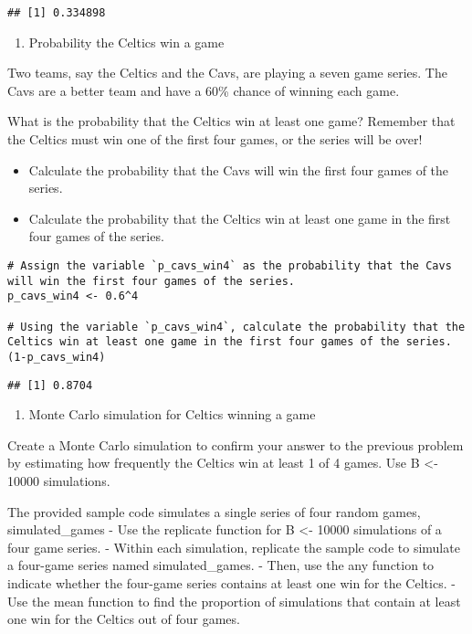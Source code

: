 \documentclass[
]{article}
\providecommand{\tightlist}{%
  \setlength{\itemsep}{0pt}\setlength{\parskip}{0pt}}
\begin{document}
\begin{verbatim}
## [1] 0.334898
\end{verbatim}

\begin{enumerate}
\def\labelenumi{\arabic{enumi}.}
\setcounter{enumi}{3}
\tightlist
\item
  Probability the Celtics win a game
\end{enumerate}

Two teams, say the Celtics and the Cavs, are playing a seven game
series. The Cavs are a better team and have a 60\% chance of winning
each game.

What is the probability that the Celtics win at least one game? Remember
that the Celtics must win one of the first four games, or the series
will be over!

\begin{itemize}
\tightlist
\item
  Calculate the probability that the Cavs will win the first four games
  of the series.
\item
  Calculate the probability that the Celtics win at least one game in
  the first four games of the series.
\end{itemize}

\begin{verbatim}
# Assign the variable `p_cavs_win4` as the probability that the Cavs will win the first four games of the series.
p_cavs_win4 <- 0.6^4

# Using the variable `p_cavs_win4`, calculate the probability that the Celtics win at least one game in the first four games of the series.
(1-p_cavs_win4)
\end{verbatim}

\begin{verbatim}
## [1] 0.8704
\end{verbatim}

\begin{enumerate}
\def\labelenumi{\arabic{enumi}.}
\setcounter{enumi}{4}
\tightlist
\item
  Monte Carlo simulation for Celtics winning a game
\end{enumerate}

Create a Monte Carlo simulation to confirm your answer to the previous
problem by estimating how frequently the Celtics win at least 1 of 4
games. Use B \textless- 10000 simulations.

The provided sample code simulates a single series of four random games,
simulated\_games - Use the replicate function for B \textless- 10000
simulations of a four game series. - Within each simulation, replicate
the sample code to simulate a four-game series named simulated\_games. -
Then, use the any function to indicate whether the four-game series
contains at least one win for the Celtics. - Use the mean function to
find the proportion of simulations that contain at least one win for the
Celtics out of four games.
\end{document}
